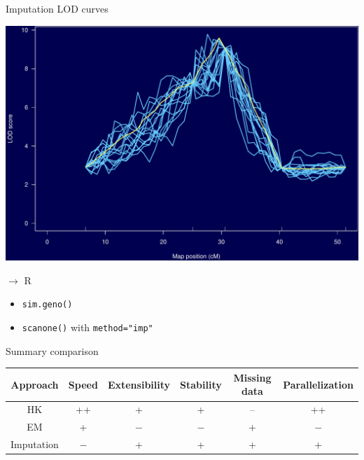 \documentclass[12pt]{article}
\newcommand{\headsize}{\fontsize{35}{35} \selectfont}
\newcommand{\smallsize}{\fontsize{25}{30} \selectfont}
\newcommand{\smallersize}{\fontsize{20}{25} \selectfont}
\begin{document}
\newpage

\headsize \color{myyellow}
\hfill \begin{minipage}{5.75in}
\centering
Imputation LOD curves
\end{minipage}

\vfill

\centerline{\includegraphics{Figs/imp_lod.pdf}}




\newpage

\headsize \color{myyellow}
$\boldsymbol{\rightarrow}$ R

\vspace{3cm}

\color{mywhite} \smallsize

\hfill \begin{minipage}[t]{9.5in}
\begin{itemize}
\itemsep24pt
\item \verb|sim.geno()|
\item \verb|scanone()| with \verb|method="imp"|
\end{itemize} \end{minipage}




\newpage

\headsize \color{myyellow}
\hfill \begin{minipage}{5.75in}
\centering
Summary comparison
\end{minipage}


\vspace{25mm}

\begin{center}
\color{mywhite}
\smallersize

\renewcommand\arraystretch{2}
\begin{tabular}{cccccc}
\hline
Approach & Speed & Extensibility & Stability & Missing data &
Parallelization \\
\hline
HK & ++ & + & + & -- & ++ \\
EM & + & $-$ & $-$ & + & $-$ \\
Imputation & $-$ & + & + & + & + \\
\hline
\end{tabular}
\end{center}
\end{document}
